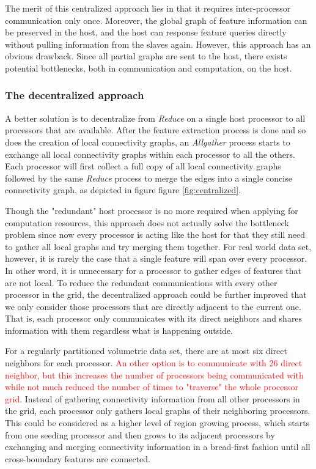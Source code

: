 \documentclass[10pt, conference, compsocconf]{IEEEtran}
\begin{document}
The merit of this centralized approach lies in that it requires inter-processor communication only once. Moreover, the global graph of feature information can be preserved in the host, and the host can response feature queries directly without pulling information from the slaves again. However, this approach has an obvious drawback. Since all partial graphs are sent to the host, there exists potential bottlenecks, both in communication and computation, on the host.  

\subsubsection{The decentralized approach}

A better solution is to decentralize from \emph{Reduce} on a single host processor to all processors that are available. After the feature extraction process is done and so does the creation of local connectivity graphs, an \emph{Allgather} process starts to exchange all local connectivity graphs within each processor to all the others. Each processor will first collect a full copy of all local connectivity graphs followed by the same \emph{Reduce} process to merge the edges into a single concise connectivity graph, as depicted in figure figure \ref{fig:centralized}.

Though the "redundant" host processor is no more required when applying for computation resources, this approach does not actually solve the bottleneck problem since now every processor is acting like the host for that they still need to gather all local graphs and try merging them together. For real world data set, however, it is rarely the case that a single feature will span over every processor. In other word, it is unnecessary for a processor to gather edges of features that are not local. To reduce the redundant communications with every other processor in the grid, the decentralized approach could be further improved that we only consider those processors that are directly adjacent to the current one. That is, each processor only communicates with its direct neighbors and shares information with them regardless what is happening outside.

For a regularly partitioned volumetric data set, there are at most six direct neighbors for each processor. \textcolor{red}{An other option is to communicate with 26 direct neighbor, but this increases the number of processors being communicated with while not much reduced the number of times to "traverse" the whole processor grid.} Instead of gathering connectivity information from all other processors in the grid, each processor only gathers local graphs of their neighboring processors. This could be considered as a higher level of region growing process, which starts from one seeding processor and then grows to its adjacent processors by exchanging and merging connectivity information in a bread-first fashion until all cross-boundary features are connected.
\end{document}

